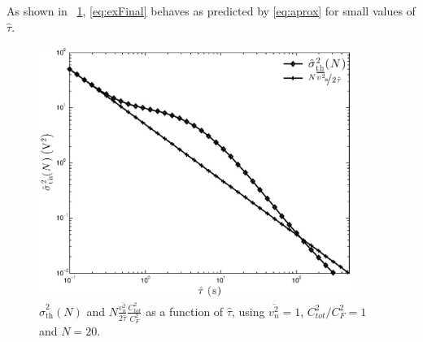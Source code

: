 As shown in \figurename~\ref{fig:exampleSigma}, \eqref{eq:exFinal} behaves as predicted by \eqref{eq:aprox} for small values of $\hat{\tau}$.
\begin{figure}[!t]
	\centering
	\includegraphics[width=4in]{./Figures/example.eps}
	\caption{$\hat{\sigma}_\text{th}^2(N)$  and $N \frac{\overline{v_n^2}}{2\hat{\tau}}\frac{C_{tot}^2}{C_F^2}$ as a function of $\hat{\tau}$, using $\overline{v_n^2} = 1$, \mbox{$C_{tot}^2/C_F^2 = 1$} and $N = 20$.}\label{fig:exampleSigma}
\end{figure}

